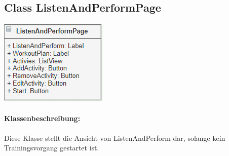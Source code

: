 \documentclass[a4paper,12pt]{article}
\begin{document}
\begin{minipage}[b]{0.7\textwidth}
	\subsection{Class ListenAndPerformPage}
\end{minipage}
\begin{minipage}[c]{0.3\textwidth}
	\includegraphics[width=\textwidth]{bilder/ViewKlassen/ListenAndPerformPage.png}
\end{minipage}
\paragraph{Klassenbeschreibung:}
Diese Klasse stellt die Ansicht von ListenAndPerform dar, solange kein Trainingsvorgang gestartet ist.
\end{document}

